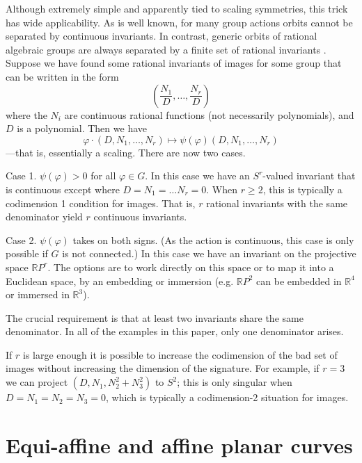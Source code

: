 \documentclass{article}
\begin{document}
\medskip

Although extremely simple and apparently tied to scaling symmetries, this trick has
wide applicability. As is well known, for many group actions orbits cannot be separated by continuous
invariants. In contrast, generic orbits of rational algebraic groups are always separated by
a finite set of rational invariants \cite{hubert}. Suppose we have found some rational
invariants of images for some group that can be written in the form
$$ \left( \frac{N_1}{D},\dots,\frac{N_r}{D}\right)$$
where the $N_i$ are continuous rational functions (not necessarily polynomials), and $D$ is a polynomial.
Then we have
$$ \varphi \cdot \left(D,N_1,\dots,N_r\right) \mapsto \psi(\varphi)(D,N_1,\dots,N_r)$$
---that is, essentially a scaling. There are now two cases.

Case 1. $\psi(\varphi)>0$ for all $\varphi\in G$. In this case we have an $S^r$-valued invariant that
is continuous except where $D=N_1=\dots N_r=0$. When $r\ge 2$, this is typically a codimension
1 condition for images. That is,  $r$ rational invariants with the same denominator yield $r$ continuous
invariants.

Case 2. $\psi(\varphi)$ takes on both signs. (As the action is continuous, this case is only
possible if $G$ is not connected.) In this case we have an invariant on the projective space $\mathbb{R}P^r$. The options are to work directly on this space or to map it into a Euclidean space, by an embedding or immersion
(e.g. $\mathbb{R}P^2$ can be embedded in $\mathbb{R}^4$ or immersed in $\mathbb{R}^3$).

The crucial requirement is that at least two invariants share the same denominator. In all
of the examples in this paper, only one denominator arises.

If $r$ is large enough it is possible to increase the codimension of the bad set of images without
increasing the dimension of the signature. For example, if $r=3$ we can project
$ (D, N_1, N_2^2+N_3^2)$
to $S^2$; this is only singular when $D=N_1=N_2=N_3=0$, which is typically a codimension-2 situation for images.

\section{Equi-affine and affine planar curves}
\end{document}
